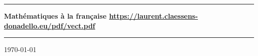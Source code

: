 
\thispagestyle{empty}
\begin{center}
	\begin{minipage}{15cm}
		\hrule\par
		\vspace{2mm}
		\begin{center}
			\Huge \bfseries Mathématiques à la française
			\normalsize
			\url{https://laurent.claessens-donadello.eu/pdf/vect.pdf}
		\end{center}
		\hrule\par
	\end{minipage}
\end{center}

\vspace{2cm}

\begin{center}

	\vspace{1cm}

	\today\\
	\texttt{\GitCommitHexsha}


\end{center}

\vfill

\LogoEtLicence

\newpage
